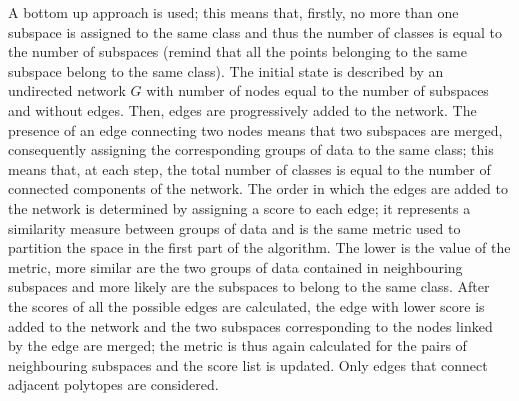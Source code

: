 \documentclass[a4paper]{article}
\begin{document}
A bottom up approach is used; this means that, firstly, no more than one subspace is assigned to the same class and thus the number of classes is equal to the number of subspaces (remind that all the points belonging to the same subspace belong to the same class).
The initial state is described by an undirected network $G$ with number of nodes equal to the number of subspaces and without edges.
Then, edges are progressively added to the network.
The presence of an edge connecting two nodes means that two subspaces are merged, consequently assigning the corresponding groups of data to the same class;
this means that, at each step, the total number of classes is equal to the number of connected components of the network.
The order in which the edges are added to the network is determined by assigning a score to each edge;
it represents a similarity measure between groups of data and is the same metric %
used to partition the space in the first part of the algorithm.
The lower is the value of the metric, more similar are the two groups of data contained in neighbouring subspaces and more likely are the subspaces to belong to the same class.
After the scores of all the possible edges are calculated, the edge with lower score is added to the network and the two subspaces corresponding to the nodes linked by the edge are merged;
the metric is thus again calculated for the pairs of neighbouring subspaces and the score list is updated.
Only edges that connect adjacent polytopes are considered.
\end{document}
